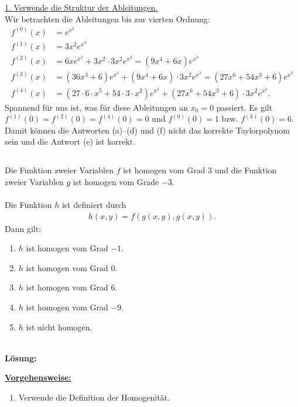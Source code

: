 \underline{1. Verwende die Struktur der Ableitungen.}\\
Wir betrachten die Ableitungen bis zur vierten Ordnung:
\begin{align*}
	f^{(0)}(x) &= e^{x^3}\\
	f^{(1)}(x) &= 3x^2 e^{x^3}\\
	f^{(2)}(x) &= 6x e^{x^3} + 3x^2 \cdot 3x^2 e^{x^3} = (9x^4 + 6x) e^{x^3}\\
	f^{(3)}(x) &= (36x^3+ 6) e^{x^3} + (9x^4 + 6x) \cdot 3 x^2 e^{x^3} 
	= (27x^6 + 54x^3 + 6) e^{x^3}\\
	f^{(4)}(x) &= (27 \cdot 6\cdot x^5+54 \cdot 3 \cdot x^2) e^{x^3}
	+ (27x^6 + 54x^3 + 6)\cdot 3 x^2 e^{x^3}.
\end{align*}
Spannend für uns ist, was für diese Ableitungen an $ x_0 = 0 $ passiert.
Es gilt $ f^{(1)}(0) = f^{(2)}(0) = f^{(4)}(0) = 0  $ und $ f^{(0)}(0) = 1 $ bzw. $ f^{(3)}(0) = 6 $.
Damit können die Antworten (a)--(d) und (f) nicht das korrekte Taylorpolynom sein und die Antwort (e) ist korrekt.

\newpage

\subsection*{}
Die Funktion zweier Variablen $ f $ ist homogen vom Grad $ 3 $ und die Funktion zweier Variablen $ g $ ist homogen vom Grade $ -3 $.\\
\\
Die Funktion $ h $ ist definiert durch
\begin{align*}
	h(x,y) = f(g(x,y),g(x,y)).
\end{align*}
Dann gilt:
\renewcommand{\labelenumi}{(\alph{enumi})}
\begin{enumerate}
	\item 
	$ h $ ist homogen vom Grad $ -1 $. 
	\item
	$ h $ ist homogen vom Grad $ 0 $. 
	\item
	$ h $ ist homogen vom Grad $ 6 $. 
	\item
	$ h $ ist homogen vom Grad $ -9 $.  
	\item
	$ h $ ist nicht homogen.
\end{enumerate}
\ \\
\textbf{Lösung:}
\begin{mdframed}
	\underline{\textbf{Vorgehensweise:}}
	\renewcommand{\labelenumi}{\theenumi.}
	\begin{enumerate}
		\item Verwende die Definition der Homogenität.
	\end{enumerate}
\end{mdframed}

